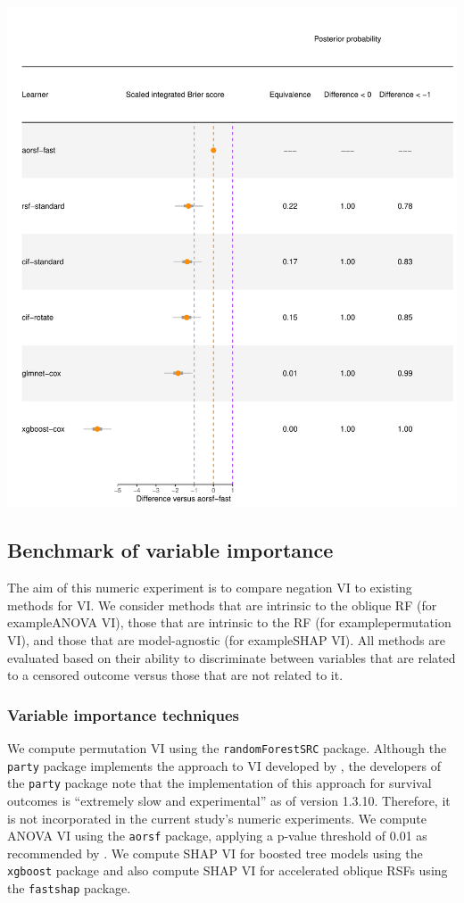\documentclass[twoside,11pt]{article}\usepackage[]{graphicx}\usepackage[]{xcolor}
\makeatletter
\def\maxwidth{ %
  \ifdim\Gin@nat@width>\linewidth
    \linewidth
  \else
    \Gin@nat@width
  \fi
}
\newenvironment{knitrout}{}{} %
\newcommand{\eg}{for example}
\makeatother
\begin{document}
\begin{knitrout}
\color{fgcolor}
\includegraphics[width=\maxwidth]{figure/unnamed-chunk-3-1} 
\end{knitrout}

\subsection{Benchmark of variable importance}

The aim of this numeric experiment is to compare negation VI to existing methods for VI. We consider methods that are intrinsic to the oblique RF (\eg ANOVA VI), those that are intrinsic to the RF (\eg permutation VI), and those that are model-agnostic (\eg SHAP VI). All methods are evaluated based on their ability to discriminate between variables that are related to a censored outcome versus those that are not related to it.

\subsubsection{Variable importance techniques}

We compute permutation VI using the \texttt{randomForestSRC} package. Although the \texttt{party} package implements the approach to VI developed by \citet{strobl2007bias}, the developers of the \texttt{party} package note that the implementation of this approach for survival outcomes is ``extremely slow and experimental'' as of version 1.3.10. Therefore, it is not incorporated in the current study's numeric experiments. We compute ANOVA VI using the \texttt{aorsf} package, applying a p-value threshold of 0.01 as recommended by \citet{menze2011oblique}. We compute SHAP VI for boosted tree models using the \texttt{xgboost} package and also compute SHAP VI for accelerated oblique RSFs using the \texttt{fastshap} package.
\end{document}
